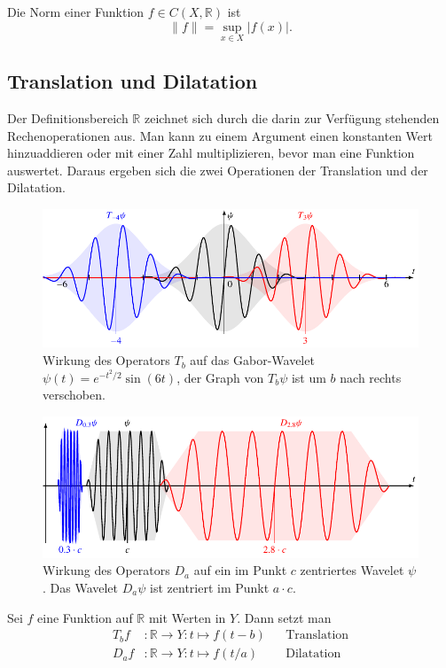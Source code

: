 \begin{definition}
Die Norm einer Funktion $f\in C(X,\mathbb R)$ ist
\[
\|f\| = \sup_{x\in X} |f(x)|.
\]
\end{definition}


\subsection{Translation und Dilatation}
Der Definitionsbereich $\mathbb R$ zeichnet sich durch die darin zur
Verfügung stehenden Rechenoperationen aus.
Man kann zu einem Argument einen konstanten Wert hinzuaddieren oder mit
einer Zahl multiplizieren, bevor man eine Funktion auswertet.
Daraus ergeben sich die zwei Operationen der Translation und der Dilatation.

\begin{figure}
\centering
\includegraphics[width=\hsize]{chapters/1-geometrie/images/translation.pdf}
\caption{Wirkung des Operators $T_b$ auf das Gabor-Wavelet
$\psi(t) = e^{-t^2/2}\sin(6t)$,
der Graph von $T_b\psi$ ist um $b$ nach rechts verschoben.
\label{geometrie:Tb:image}}
\end{figure}
\begin{figure}
\centering
\includegraphics[width=\hsize]{chapters/1-geometrie/images/dilatation.pdf}
\caption{Wirkung des Operators $D_a$ auf ein im Punkt $c$ zentriertes
Wavelet $\psi$. Das Wavelet $D_a\psi$ ist zentriert im Punkt $a\cdot c$.
\label{geometrie:Da:image}}
\end{figure}

\begin{definition}
Sei $f$ eine Funktion auf $\mathbb R$ mit Werten in $Y$.
Dann setzt man
\begin{align*}
T_bf&\colon \mathbb R \to Y: t\mapsto f(t-b)&&\text{Translation}
\\
D_af&\colon \mathbb R \to Y: t\mapsto f(t/a)&&\text{Dilatation}
\end{align*}
\end{definition}

